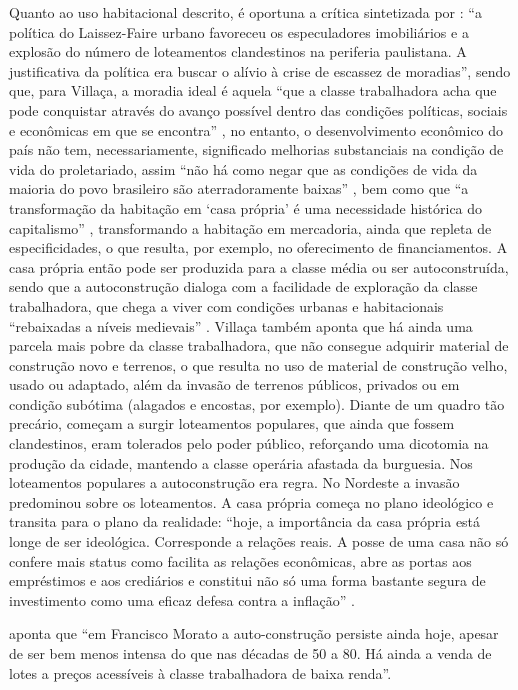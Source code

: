 	Quanto ao uso habitacional descrito, é oportuna a crítica sintetizada por : ``a política do Laissez-Faire urbano favoreceu os especuladores imobiliários e a explosão do número de loteamentos clandestinos na periferia paulistana. A justificativa da política era buscar o alívio à crise de escassez de moradias'', sendo que, para Villaça, a moradia ideal é aquela ``que a classe trabalhadora acha que pode conquistar através do avanço possível dentro das condições políticas, sociais e econômicas em que se encontra'' \cite[p.13]{villaca1986a}, no entanto, o desenvolvimento econômico do país não tem, necessariamente, significado melhorias substanciais na condição de vida do proletariado, assim ``não há como negar que as condições de vida da maioria do povo brasileiro são aterradoramente baixas'' \cite[p.14]{villaca1986a}, bem como que ``a transformação da habitação em `casa própria' é uma necessidade histórica do capitalismo'' \cite[p.19]{villaca1986a}, transformando a habitação em mercadoria, ainda que repleta de especificidades, o que resulta, por exemplo, no oferecimento de financiamentos. A casa própria então pode ser produzida para a classe média ou ser autoconstruída, sendo que a autoconstrução dialoga com a facilidade de exploração da classe trabalhadora, que chega a viver com condições urbanas e habitacionais ``rebaixadas a níveis medievais'' \cite[p.21]{villaca1986a}. Villaça também aponta que há ainda uma parcela mais pobre da classe trabalhadora, que não consegue adquirir material de construção novo e terrenos, o que resulta no uso de material de construção velho, usado ou adaptado, além da invasão de terrenos públicos, privados ou em condição subótima (alagados e encostas, por exemplo). Diante de um quadro tão precário, começam a surgir loteamentos populares, que ainda que fossem clandestinos, eram tolerados pelo poder público, reforçando uma dicotomia na produção da cidade, mantendo a classe operária afastada da burguesia. Nos loteamentos populares a autoconstrução era regra. No Nordeste a invasão predominou sobre os loteamentos. A casa própria começa no plano ideológico e transita para o plano da realidade: ``hoje, a importância da casa própria está longe de ser ideológica. Corresponde a relações reais. A posse de uma casa não só confere mais status como facilita as relações econômicas, abre as portas aos empréstimos e aos crediários e constitui não só uma forma bastante segura de investimento como uma eficaz defesa contra a inflação'' \cite[p.24]{villaca1986a}.
	
	 aponta que ``em Francisco Morato a auto-construção persiste ainda hoje, apesar de ser bem menos intensa do que nas décadas de 50 a 80. Há ainda a venda de lotes a preços acessíveis à classe trabalhadora de baixa renda''.
	
